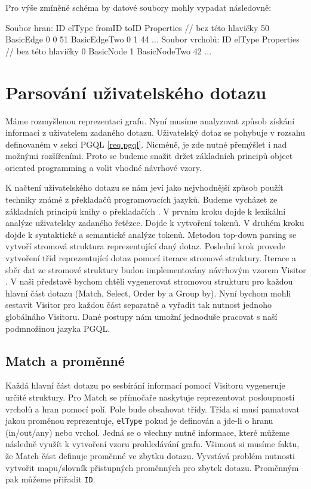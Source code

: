 Pro výše zmíněné schéma by datové soubory mohly vypadat následovně:
\begin{code}
Soubor hran:
ID elType fromID toID Properties // bez této hlavičky
50 BasicEdge 0 0 
51 BasicEdgeTwo 0 1 44
...
Soubor vrcholů:
ID elType Properties // bez této hlavičky
0 BasicNode
1 BasicNodeTwo 42
...
\end{code}

\section{Parsování uživatelského dotazu}

Máme rozmyšlenou reprezentaci grafu.
Nyní musíme analyzovat způsob získání informací z uživatelem zadaného dotazu.
Uživatelský dotaz se pohybuje v rozsahu definovaném v sekci PGQL \ref{req.pgql}.
Nicméně, je zde nutné přemýšlet i nad možnými rozšířeními.
Proto se budeme snažit držet základních principů object oriented programming a volit vhodné návrhové vzory.

K načtení uživatelského dotazu se nám jeví jako nejvhodnější způsob použít techniky známé z překladačů programovacích jazyků.
Budeme vycházet ze základních principů knihy o překladačích \citep{dragoonBook}.
V prvním kroku dojde k lexikální analýze uživatelsky zadaného řetězce.
Dojde k vytvoření tokenů.
V druhém kroku dojde k syntaktické a semantické analýze tokenů.
Metodou top-down parsing \citep[str. 217]{dragoonBook} se vytvoří stromová struktura reprezentující daný dotaz.
Poslední krok provede vytvoření tříd reprezentující dotaz pomocí iterace stromové struktury.
Iterace a sběr dat ze stromové struktury budou implementovány návrhovým vzorem Visitor \citep[str. 331]{patterns}.
V naši představě bychom chtěli vygenerovat stromovou strukturu pro každou hlavní část dotazu (Match, Select, Order by a Group by).
Nyní bychom mohli sestavit Visitor pro každou část separatně a vyřadit tak nutnost jednoho globálnáho Visitoru.
Dané postupy nám umožní jednoduše pracovat s naší podmnožinou jazyka PGQL.


\subsection{Match a proměnné}

Každá hlavní část dotazu po sesbírání informací pomocí Visitoru vygeneruje určité struktury.
Pro Match se přímočaře naskytuje reprezentovat posloupnosti vrcholů a hran pomocí polí.
Pole bude obsahovat třídy.
Třída si musí pamatovat jakou proměnou reprezentuje, \verb+elType+ pokud je definován a jde-li o hranu (in/out/any) nebo vrchol.
Jedná se o všechny nutné informace, které můžeme následně využít k vytvoření vzoru prohledávání grafu.
Všimout si musíme faktu, že Match část definuje proměnné ve zbytku dotazu.
Vyvstává problém nutnosti vytvořit mapu/slovník přistupných proměnných pro zbytek dotazu.
Proměnným pak můžeme přiřadit \verb+ID+.

